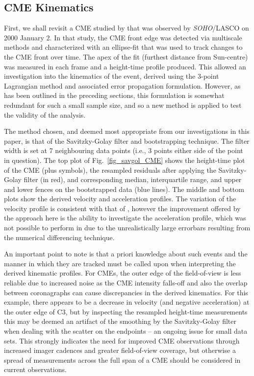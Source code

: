 \documentclass[referee]{aa}
\begin{document}
\subsection{CME Kinematics}
\label{subsect:corimp}


First, we shall revisit a CME studied by \citet{2009A&A...495..325B} that was observed by \emph{SOHO}/LASCO on 2000 January 2. In that study, the CME front edge was detected via multiscale methods and characterized with an ellipse-fit that was used to track changes to the CME front over time. The apex of the fit (furthest distance from Sun-centre) was measured in each frame and a height-time profile produced. This allowed an investigation into the kinematics of the event, derived using the 3-point Lagrangian method and associated error propagation formulation. However, as has been outlined in the preceding sections, this formulation is somewhat redundant for such a small sample size, and so a new method is applied to test the validity of the analysis.

The method chosen, and deemed most appropriate from our investigations in this paper, is that of the Savitzky-Golay filter and bootstrapping technique. The filter width is set at 7 neighbouring data points (i.e., 3 points either side of the point in question). The top plot of Fig.~\ref{fig_savgol_CME} shows the height-time plot of the CME (plus symbols), the resampled residuals after applying the Savitzky-Golay filter (in red), and corresponding median, interquartile range, and upper and lower fences on the bootstrapped data (blue lines). The middle and bottom plots show the derived velocity and acceleration profiles. The variation of the velocity profile is consistent with that of \citet{2009A&A...495..325B}, however the improvement offered by the approach here is the ability to investigate the acceleration profile, which was not possible to perform in \citet{2009A&A...495..325B} due to the unrealistically large errorbars resulting from the numerical differencing technique.

An important point to note is that a priori knowledge about such events and the manner in which they are tracked must be called upon when interpreting the derived kinematic profiles. For CMEs, the outer edge of the field-of-view is less reliable due to increased noise as the CME intensity falls-off and also the overlap between coronagraphs can cause discrepancies in the derived kinematics. For this example, there appears to be a decrease in velocity (and negative acceleration) at the outer edge of C3, but by inspecting the resampled height-time measurements this may be deemed an artifact of the smoothing by the Savitzky-Golay filter when dealing with the scatter on the endpoints -- an ongoing issue for small data sets. This strongly indicates the need for improved CME observations through increased imager cadences and greater field-of-view coverage, but otherwise a spread of measurements across the full span of a CME should be considered in current observations.
\end{document}
